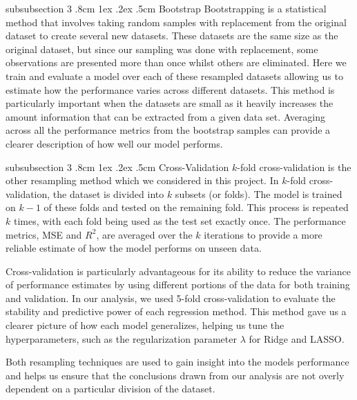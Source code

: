 \documentclass[%
reprint,
amsmath,amssymb,
aps,
pra,
]{revtex4-2}
\makeatletter
\renewcommand{\subsubsection}{%
	\@startsection
	{subsubsection}%
	{3}%
	{\z@}%
	{.8cm \@plus1ex \@minus .2ex}%
	{.5cm}%
	{\normalfont\small\centering}%
}
\makeatother
\begin{document}
\subsubsection{Bootstrap} 
Bootstrapping is a statistical method that involves taking random samples with replacement from the original dataset to create several new datasets. These datasets are the same size as the original dataset, but since our sampling was done with replacement, some observations are presented more than once whilst others are eliminated. Here we train and evaluate a model over each of these resampled datasets allowing us to estimate how the performance varies across different datasets. This method is particularly important when the datasets are small as it heavily increases the amount information that can be extracted from a given data set. Averaging across all the performance metrics from the bootstrap samples can provide a clearer description of how well our model performs. 

\subsubsection{Cross-Validation} 
$k$-fold cross-validation is the other resampling method which we considered in this project. In $k$-fold cross-validation, the dataset is divided into $k$ subsets (or folds). The model is trained on $k-1$ of these folds and tested on the remaining fold. This process is repeated $k$ times, with each fold being used as the test set exactly once. The performance metrics, MSE and $R^2$, are averaged over the $k$ iterations to provide a more reliable estimate of how the model performs on unseen data.

Cross-validation is particularly advantageous for its ability to reduce the variance of performance estimates by using different portions of the data for both training and validation. In our analysis, we used 5-fold cross-validation to evaluate the stability and predictive power of each regression method. This method gave us a clearer picture of how each model generalizes, helping us tune the hyperparameters, such as the regularization parameter $\lambda$ for Ridge and LASSO.

Both resampling techniques are used to gain insight into the models performance and helps us ensure that the conclusions drawn from our analysis are not overly dependent on a particular division of the dataset.
\end{document}
